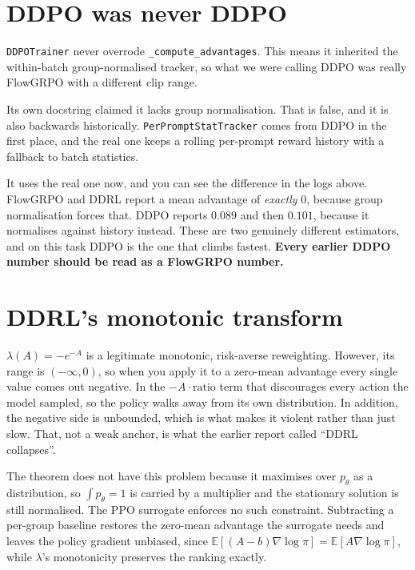 \documentclass[11pt]{article}
\newcommand{\code}[1]{\texttt{\small #1}}
\begin{document}
\section{DDPO was never DDPO}

\code{DDPOTrainer} never overrode \code{\_compute\_advantages}. This means it inherited the within-batch group-normalised tracker, so what we were calling DDPO was really FlowGRPO with a different clip range.

Its own docstring claimed it lacks group normalisation. That is false, and it is also backwards historically. \code{PerPromptStatTracker} comes from DDPO in the first place, and the real one keeps a rolling per-prompt reward history with a fallback to batch statistics.

It uses the real one now, and you can see the difference in the logs above. FlowGRPO and DDRL report a mean advantage of \emph{exactly} $0$, because group normalisation forces that. DDPO reports $0.089$ and then $0.101$, because it normalises against history instead. These are two genuinely different estimators, and on this task DDPO is the one that climbs fastest. \textbf{Every earlier DDPO number should be read as a FlowGRPO number.}

\section{DDRL's monotonic transform}

$\lambda(A) = -e^{-A}$ is a legitimate monotonic, risk-averse reweighting. However, its range is $(-\infty, 0)$, so when you apply it to a zero-mean advantage every single value comes out negative. In the $-A\cdot\text{ratio}$ term that discourages every action the model sampled, so the policy walks away from its own distribution. In addition, the negative side is unbounded, which is what makes it violent rather than just slow. That, not a weak anchor, is what the earlier report called ``DDRL collapses''.

The theorem does not have this problem because it maximises over $p_\theta$ as a distribution, so $\int p_\theta = 1$ is carried by a multiplier and the stationary solution is still normalised. The PPO surrogate enforces no such constraint. Subtracting a per-group baseline restores the zero-mean advantage the surrogate needs and leaves the policy gradient unbiased, since $\mathbb{E}[(A-b)\nabla\log\pi] = \mathbb{E}[A\nabla\log\pi]$, while $\lambda$'s monotonicity preserves the ranking exactly.
\end{document}
